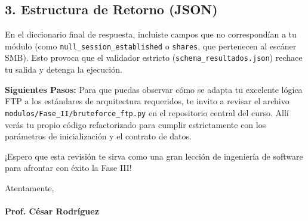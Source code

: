 \documentclass[12pt,letterpaper]{article}
\begin{document}
\subsection*{3. Estructura de Retorno (JSON)}
En el diccionario final de respuesta, incluiste campos que no correspondían a tu módulo (como \texttt{null\_session\_established} o \texttt{shares}, que pertenecen al escáner SMB). Esto provoca que el validador estricto (\texttt{schema\_resultados.json}) rechace tu salida y detenga la ejecución.

\vspace{0.5cm}

\noindent \textbf{Siguientes Pasos:}
Para que puedas observar cómo se adapta tu excelente lógica FTP a los estándares de arquitectura requeridos, te invito a revisar el archivo \texttt{modulos/Fase\_II/bruteforce\_ftp.py} en el repositorio central del curso. Allí verás tu propio código refactorizado para cumplir estrictamente con los parámetros de inicialización y el contrato de datos.

\vspace{0.5cm}
¡Espero que esta revisión te sirva como una gran lección de ingeniería de software para afrontar con éxito la Fase III!

\vspace{1cm}
\noindent Atentamente, \\
\vspace{0.5cm} \\
\textbf{Prof. César Rodríguez}
\end{document}
